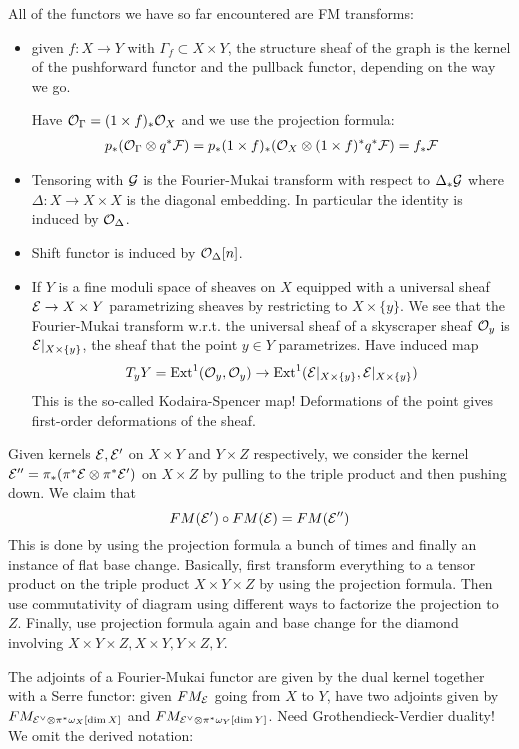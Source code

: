 All of the functors we have so far encountered are FM transforms:
\begin{itemize}
    \item  given $f:X\rightarrow Y$ with $\Gamma_f\subset X\times Y$, the structure sheaf of the graph is the kernel of the pushforward functor and the pullback functor, depending on the way we go.

    Have $\mathcal{O}_{\Gamma}=(1\times f)_{*}\mathcal{O}_{X}$ and we use the projection formula: $$\begin{gathered}
p_{*}(\mathcal{O}_{\Gamma}\otimes q^*\mathcal{F})=p_{*}(1\times f)_{*}(\mathcal{O}_{X}\otimes (1\times f)^*q^*\mathcal{F})=f_{*}\mathcal{F}\end{gathered}$$

    \item Tensoring with $\mathcal{G}$ is the Fourier-Mukai transform with respect to $\Delta_{*}\mathcal{G}$ where $\Delta:X\to X\times X$ is the diagonal embedding. In particular
        the identity is induced by $\mathcal{O}_\Delta$.
    \item Shift functor is induced by $\mathcal{O}_{\Delta}[n]$.
    \item If $Y$ is a fine moduli space of sheaves on $X$ equipped with a universal sheaf $\mathcal{E}\rightarrow X\times Y$ parametrizing sheaves by restricting to $X\times \{y\}$. We see that the Fourier-Mukai transform w.r.t. the universal sheaf of a skyscraper sheaf $\mathcal{O}_{y}$ is $\mathcal{E}|_{X\times \{y\}}$, the sheaf that the point $y\in Y$ parametrizes. Have induced map $$T_{y}Y=\operatorname{Ext}^1(\mathcal{O}_{y},\mathcal{O}_{y})\rightarrow \operatorname{Ext}^1(\mathcal{E}|_{X\times \{y\}},\mathcal{E}|_{X\times \{y\}})$$This is the so-called Kodaira-Spencer map! Deformations of the point gives first-order deformations of the sheaf.
\end{itemize}

Given kernels $\mathcal{E}, \mathcal{E}'$ on $X\times Y$ and $Y\times Z$ respectively, we consider the kernel $\mathcal{E}''=\pi_{*}(\pi^*\mathcal{E}\otimes \pi^*\mathcal{E}')$ on $X\times Z$ by pulling to the triple product and then pushing down. We claim that $$FM(\mathcal{E}')\circ FM(\mathcal{E})=FM(\mathcal{E}'')$$This is done by using the projection formula a bunch of times and finally an instance of flat base change. Basically, first transform everything to a tensor product on the triple product $X\times Y \times Z$ by using the projection formula. Then use commutativity of diagram using different ways to factorize the projection to $Z$. Finally, use projection formula again and base change for the diamond involving $X\times Y \times Z, X\times Y, Y\times Z, Y$.

The adjoints of a Fourier-Mukai functor are given by the dual kernel together with a Serre functor: given $FM_{\mathcal{E}}$ going from $X$ to $Y$, have two adjoints given by $FM_{\mathcal{E}^\vee \otimes \pi^* \omega_{X}[\dim X]}$ and $FM_{\mathcal{E}^\vee \otimes \pi^* \omega_{Y}[\dim Y]}$. Need Grothendieck-Verdier duality! We omit the derived notation:

